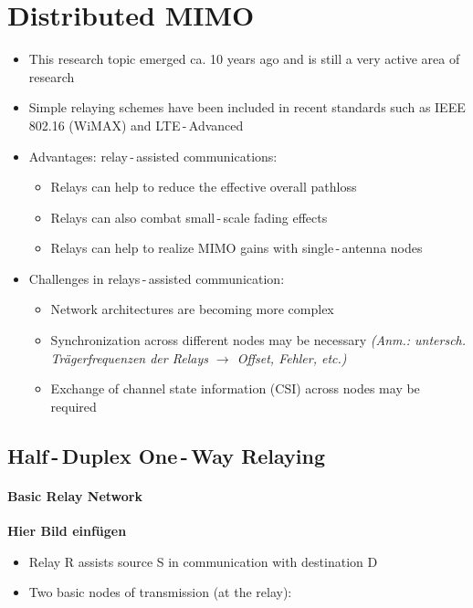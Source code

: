 \documentclass[a4paper, 10pt]{article}
\begin{document}
\setcounter{section}{3}
\tableofcontents
\section{Distributed MIMO}
\begin{itemize}
	\item This research topic emerged ca. 10 years ago and is still a very active area of research
	\item Simple relaying schemes have been included in recent standards such as IEEE 802.16 (WiMAX) and LTE\,-\,Advanced
	\item Advantages: relay\,-\,assisted communications:
	\begin{itemize}
		\item Relays can help to reduce the effective overall pathloss
		\item Relays can also combat small\,-\,scale fading effects
		\item Relays can help to realize MIMO gains with single\,-\,antenna nodes
	\end{itemize}
	\item Challenges in relays\,-\,assisted communication:
	\begin{itemize}
		\item Network architectures are becoming more complex
		\item Synchronization across different nodes may be necessary \textit{(Anm.: untersch. Tr\"agerfrequenzen der Relays $\rightarrow $ Offset, Fehler, etc.)}
		\item Exchange of channel state information (CSI) across nodes may be required
	\end{itemize}
\end{itemize}

\subsection{Half\,-\,Duplex One\,-\,Way Relaying}
\paragraph{Basic Relay Network}
\textbf{Hier Bild einf\"ugen}
\begin{itemize}
	\item Relay R assists source S in communication with destination D
	\item Two basic nodes of transmission (at the relay):
\end{itemize}
\end{document}

